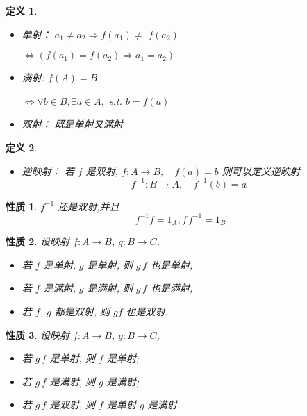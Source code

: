\documentclass[13pt]{beamer}
\newtheorem*{defi}{定义}
\newtheorem*{prop}{性质}
\begin{document}
\begin{frame}
\begin{defi}
\begin{itemize}
	\item 单射： $a_{1} \neq a_{2} \Rightarrow f\left(a_{1}\right) \neq$
$f\left(a_{2}\right)$

\qquad $\Leftrightarrow\left(f\left(a_{1}\right)=f\left(a_{2}\right) \Rightarrow a_{1}=a_{2}\right)$
\item 满射: $f(A)=B$

\qquad  $\Leftrightarrow \forall b \in B, \exists a \in A,$ s.t. $b=f(a)$
\item 双射： 既是单射又满射
\end{itemize}
\end{defi}
\begin{defi}
\begin{itemize}
	\item
逆映射： 若 $f$ 是双射, $f: A \rightarrow B, \quad f(a)=b$ 则可以定义逆映射 
\[f^{-1}: B \rightarrow A, \quad  f^{-1}(b)=a\]
\end{itemize}
\end{defi}
\begin{prop}
$f^{-1}$ 还是双射,并且
\[
f^{-1} f=1_{A}, f\, f^{-1}=1_{B}
\]		
\end{prop}
\end{frame}





\begin{frame}
\begin{prop}
设映射 $f: A \rightarrow B$, $g: B \rightarrow C$,
\begin{itemize}
\item  若 $f$ 是单射, ${g}$ 是单射, 则 ${g}\, {f}$ 也是单射;
\item  若 $f$ 是满射, ${g}$ 是满射, 则 $g\, f$ 也是满射;
\item  若 $f$, $g$ 都是双射, 则 $g f$ 也是双射.
\end{itemize}
\end{prop}

\begin{prop}
设映射 $f: A \rightarrow B$, $g: B \rightarrow C$,
\begin{itemize}
\item  若 $g\, f$ 是单射, 则 ${f}$ 是单射;
\item  若 $g\, f$ 是满射, 则 $g$ 是满射;
\item  若 $g\, f$ 是双射, 则 ${f}$ 是单射 ${g}$ 是满射.
\end{itemize}
\end{prop}
\end{frame}
\end{document}
